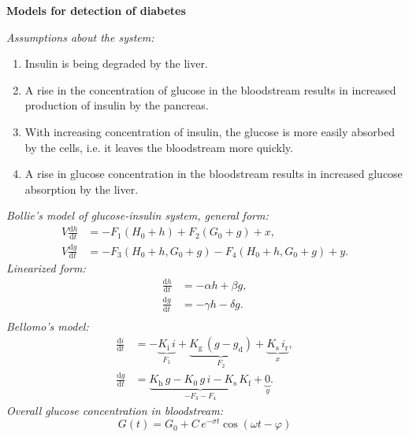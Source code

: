 \documentclass{article}
\providecommand{\m}[1]{\ensuremath{\mathrm{#1}}}
\begin{document}
 \begin{center}
   \Large \textbf{Models for detection of diabetes}
 \end{center}
\emph{Assumptions about the system:}
\begin{enumerate}
	\item
	Insulin is being degraded by the liver.	
	\item
	A rise in the concentration of glucose in the bloodstream results in increased production of insulin by the pancreas.
	\item
	With increasing concentration of insulin, the glucose is more easily absorbed by the cells, i.e. it leaves the bloodstream more quickly.
	\item
	A rise in glucose concentration in the bloodstream results in increased glucose absorption by the liver.

\end{enumerate}
\emph{Bollie's model of glucose-insulin system, general form:}
\begin{equation*}
\label{eqbolieEquilibrium}
\begin{aligned}
V\frac{\m{d}h}{\m{d}t}&=-F_1(H_0+h)+F_2(G_0+g)+ x,\\
V\frac{\m{d}g}{\m{d}t}&=-F_3(H_0+h,G_0+g)-F_4(H_0+h,G_0+g)+ y.
\end{aligned}
\end{equation*}
\emph{Linearized form:}
\begin{equation*}
\label{eqLinearized}
\begin{aligned}
\frac{\m{d}h}{\m{d}t}&=-\alpha h + \beta g,\\
\frac{\m{d}g}{\m{d}t}&=-\gamma h - \delta g.\\
\end{aligned}
\end{equation*}
\emph{Bellomo's model:}
\begin{equation*}
\label{Eq:bellomo}
\begin{aligned}
 \frac{\m{d}i}{\m{d}t} &= -\underbrace{K_{\mathrm{i}}\,i}_{F_1} + \underbrace{K_{\mathrm{g}}\,(g - g_{\mathrm{d}})}_{F_2} + \underbrace{K_{\mathrm{s}}\,i_{\mathrm{r}}}_{x}, \\
 \frac{\m{d}g}{\m{d}t} &= \underbrace{K_{\mathrm{h}}\,g - K_0\,g\,i - K_{\mathrm{s}}\,K_{\mathrm{f}}}_{-F_3-F_4} + \underbrace{0}_{y}.
\end{aligned}
\end{equation*}
\emph{Overall glucose concentration in bloodstream:}
\[G(t) = G_0 + C\,e^{-\sigma t}\cos ( \omega t  - \varphi) \]
\end{document}
